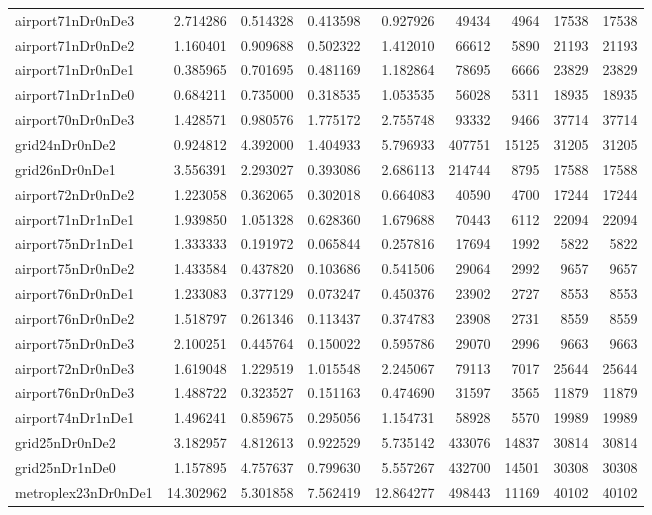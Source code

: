 \begin{longtable}{|l|r|r|r|r|r|r|r|r|}
airport71nDr0nDe3 & 2.714286 & 0.514328 & 0.413598 & 0.927926 & 49434 & 4964 & 17538 & 17538 \\
airport71nDr0nDe2 & 1.160401 & 0.909688 & 0.502322 & 1.412010 & 66612 & 5890 & 21193 & 21193 \\
airport71nDr0nDe1 & 0.385965 & 0.701695 & 0.481169 & 1.182864 & 78695 & 6666 & 23829 & 23829 \\
airport71nDr1nDe0 & 0.684211 & 0.735000 & 0.318535 & 1.053535 & 56028 & 5311 & 18935 & 18935 \\
airport70nDr0nDe3 & 1.428571 & 0.980576 & 1.775172 & 2.755748 & 93332 & 9466 & 37714 & 37714 \\
grid24nDr0nDe2 & 0.924812 & 4.392000 & 1.404933 & 5.796933 & 407751 & 15125 & 31205 & 31205 \\
grid26nDr0nDe1 & 3.556391 & 2.293027 & 0.393086 & 2.686113 & 214744 & 8795 & 17588 & 17588 \\
airport72nDr0nDe2 & 1.223058 & 0.362065 & 0.302018 & 0.664083 & 40590 & 4700 & 17244 & 17244 \\
airport71nDr1nDe1 & 1.939850 & 1.051328 & 0.628360 & 1.679688 & 70443 & 6112 & 22094 & 22094 \\
airport75nDr1nDe1 & 1.333333 & 0.191972 & 0.065844 & 0.257816 & 17694 & 1992 & 5822 & 5822 \\
airport75nDr0nDe2 & 1.433584 & 0.437820 & 0.103686 & 0.541506 & 29064 & 2992 & 9657 & 9657 \\
airport76nDr0nDe1 & 1.233083 & 0.377129 & 0.073247 & 0.450376 & 23902 & 2727 & 8553 & 8553 \\
airport76nDr0nDe2 & 1.518797 & 0.261346 & 0.113437 & 0.374783 & 23908 & 2731 & 8559 & 8559 \\
airport75nDr0nDe3 & 2.100251 & 0.445764 & 0.150022 & 0.595786 & 29070 & 2996 & 9663 & 9663 \\
airport72nDr0nDe3 & 1.619048 & 1.229519 & 1.015548 & 2.245067 & 79113 & 7017 & 25644 & 25644 \\
airport76nDr0nDe3 & 1.488722 & 0.323527 & 0.151163 & 0.474690 & 31597 & 3565 & 11879 & 11879 \\
airport74nDr1nDe1 & 1.496241 & 0.859675 & 0.295056 & 1.154731 & 58928 & 5570 & 19989 & 19989 \\
grid25nDr0nDe2 & 3.182957 & 4.812613 & 0.922529 & 5.735142 & 433076 & 14837 & 30814 & 30814 \\
grid25nDr1nDe0 & 1.157895 & 4.757637 & 0.799630 & 5.557267 & 432700 & 14501 & 30308 & 30308 \\
metroplex23nDr0nDe1 & 14.302962 & 5.301858 & 7.562419 & 12.864277 & 498443 & 11169 & 40102 & 40102 \\

\end{longtable}
